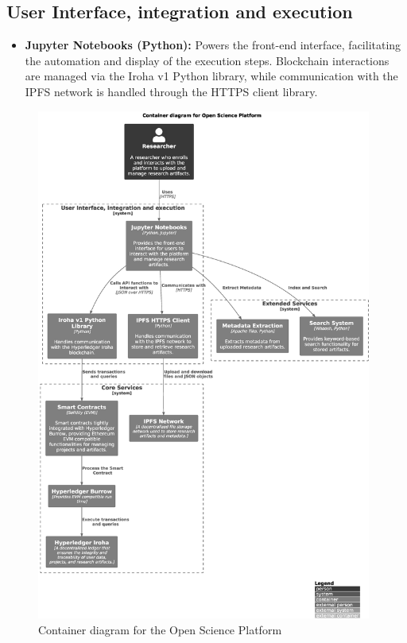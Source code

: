 \documentclass[final]{rc-book-2.14}
\begin{document}
\subsection{User Interface, integration and execution}

\begin{itemize}
    \item \textbf{Jupyter Notebooks (Python):} Powers the front-end interface, facilitating the automation and display of the execution steps. Blockchain interactions are managed via the Iroha v1 Python library, while communication with the IPFS network is handled through the HTTPS client library.
\end{itemize}

\begin{figure}[htbp]
    \centering
    \includegraphics[width=0.98\textwidth, keepaspectratio]{fig/c4_container_diagram}
    \caption{Container diagram for the Open Science Platform}
    \label{fig:c4_container_diagram}
\end{figure}
\end{document}
